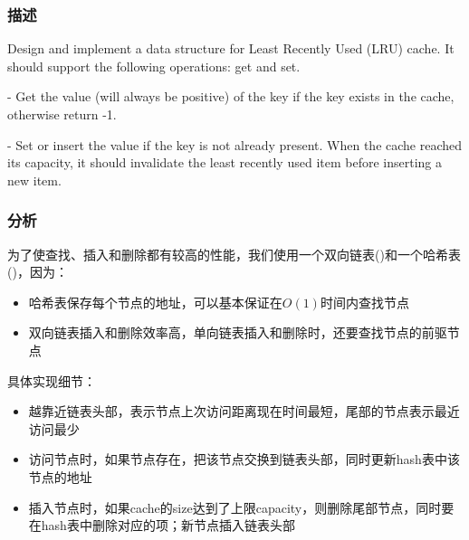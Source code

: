 \subsubsection{描述}
Design and implement a data structure for Least Recently Used (LRU) cache. It should support the following operations: get and set.

 - Get the value (will always be positive) of the key if the key exists in the cache, otherwise return -1.

 - Set or insert the value if the key is not already present. When the cache reached its capacity, it should invalidate the least recently used item before inserting a new item.


\subsubsection{分析}
为了使查找、插入和删除都有较高的性能，我们使用一个双向链表()和一个哈希表()，因为：
\begin{itemize}
\item{哈希表保存每个节点的地址，可以基本保证在$O(1)$时间内查找节点}
\item{双向链表插入和删除效率高，单向链表插入和删除时，还要查找节点的前驱节点}
\end{itemize}

具体实现细节：
\begin{itemize}
\item{越靠近链表头部，表示节点上次访问距离现在时间最短，尾部的节点表示最近访问最少}
\item{访问节点时，如果节点存在，把该节点交换到链表头部，同时更新hash表中该节点的地址}
\item{插入节点时，如果cache的size达到了上限capacity，则删除尾部节点，同时要在hash表中删除对应的项；新节点插入链表头部}              
\end{itemize}


